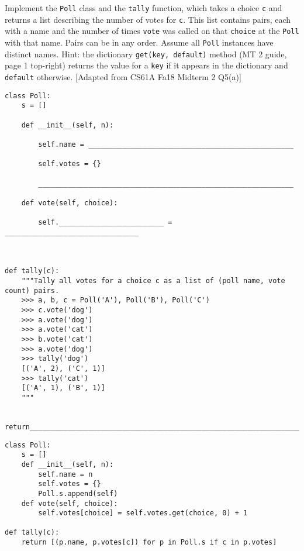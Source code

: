 \begin{blocksection}
    \question {} Implement the \lstinline{Poll} class and the \lstinline{tally} function, which takes a choice \lstinline{c} and returns a list describing the number of votes for \lstinline{c}. 
    This list contains pairs, each with a name and the number of times \lstinline{vote} was called on that \lstinline{choice} at the \lstinline{Poll} with that name. Pairs can be in any order. Assume all \lstinline{Poll}
    instances have distinct names. Hint: the dictionary \lstinline{get(key, default)} method (MT 2 guide, page 1
    top-right) returns the value for a \lstinline{key} if it appears in the dictionary and \lstinline{default} otherwise. [Adapted from CS61A Fa18 Midterm 2 Q5(a)]

    \begin{lstlisting}
class Poll:
    s = []

    def __init__(self, n):

        self.name = _________________________________________________

        self.votes = {}

        _____________________________________________________________

    def vote(self, choice):

        self._________________________ = ________________________________
    


def tally(c):
    """Tally all votes for a choice c as a list of (poll name, vote count) pairs.
    >>> a, b, c = Poll('A'), Poll('B'), Poll('C')
    >>> c.vote('dog')
    >>> a.vote('dog')
    >>> a.vote('cat')
    >>> b.vote('cat')
    >>> a.vote('dog')
    >>> tally('dog')
    [('A', 2), ('C', 1)]
    >>> tally('cat')
    [('A', 1), ('B', 1)]
    """

    return____________________________________________________________________
    \end{lstlisting}
    
    
    \begin{solution}

    \begin{lstlisting}
class Poll:
    s = []
    def __init__(self, n):
        self.name = n
        self.votes = {}
        Poll.s.append(self)
    def vote(self, choice):
        self.votes[choice] = self.votes.get(choice, 0) + 1

def tally(c):
    return [(p.name, p.votes[c]) for p in Poll.s if c in p.votes]
    \end{lstlisting}
    
    \end{solution}
    \end{blocksection}